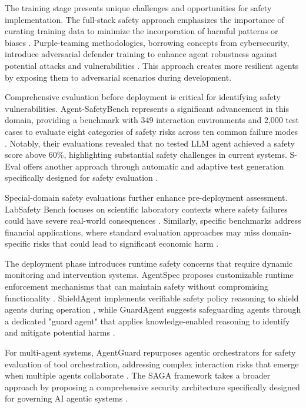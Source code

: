 \documentclass[conference]{IEEEtran}
\begin{document}
The training stage presents unique challenges and opportunities for safety implementation. The full-stack safety approach emphasizes the importance of curating training data to minimize the incorporation of harmful patterns or biases \cite{2504.15585}. Purple-teaming methodologies, borrowing concepts from cybersecurity, introduce adversarial defender training to enhance agent robustness against potential attacks and vulnerabilities \cite{2407.01850}. This approach creates more resilient agents by exposing them to adversarial scenarios during development.

Comprehensive evaluation before deployment is critical for identifying safety vulnerabilities. Agent-SafetyBench represents a significant advancement in this domain, providing a benchmark with 349 interaction environments and 2,000 test cases to evaluate eight categories of safety risks across ten common failure modes \cite{2412.14470}. Notably, their evaluations revealed that no tested LLM agent achieved a safety score above 60\%, highlighting substantial safety challenges in current systems. S-Eval offers another approach through automatic and adaptive test generation specifically designed for safety evaluation \cite{2405.14191}.

Special-domain safety evaluations further enhance pre-deployment assessment. LabSafety Bench focuses on scientific laboratory contexts where safety failures could have severe real-world consequences \cite{2410.14182}. Similarly, specific benchmarks address financial applications, where standard evaluation approaches may miss domain-specific risks that could lead to significant economic harm \cite{2502.15865}.

The deployment phase introduces runtime safety concerns that require dynamic monitoring and intervention systems. AgentSpec proposes customizable runtime enforcement mechanisms that can maintain safety without compromising functionality \cite{2503.18666}. ShieldAgent implements verifiable safety policy reasoning to shield agents during operation \cite{2503.22738}, while GuardAgent suggests safeguarding agents through a dedicated "guard agent" that applies knowledge-enabled reasoning to identify and mitigate potential harms \cite{2406.09187}.

For multi-agent systems, AgentGuard repurposes agentic orchestrators for safety evaluation of tool orchestration, addressing complex interaction risks that emerge when multiple agents collaborate \cite{2502.09809}. The SAGA framework takes a broader approach by proposing a comprehensive security architecture specifically designed for governing AI agentic systems \cite{2504.21034}.
\end{document}
